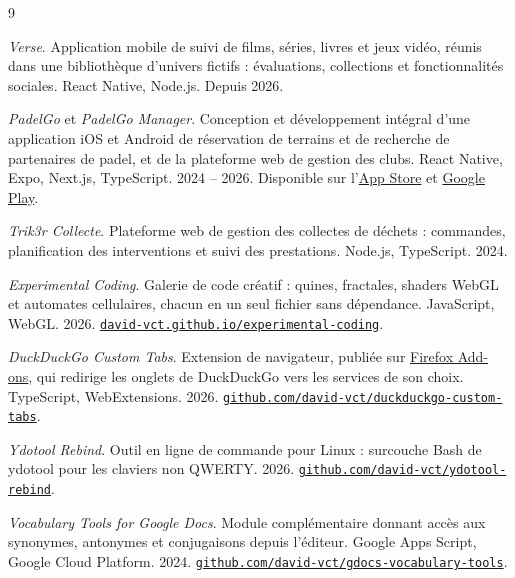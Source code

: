 \documentclass[10pt,a4paper]{article}
\begin{document}
\begin{small}
\begin{thebibliography}{9}
\setlength{\itemsep}{1pt}

\textit{Verse}. Application mobile de suivi de films, séries, livres et jeux
vidéo, réunis dans une bibliothèque d’univers fictifs : évaluations,
collections et fonctionnalités sociales. React Native, Node.js. Depuis 2026.

\textit{PadelGo} et \textit{PadelGo Manager}. Conception et développement
intégral d’une application iOS et Android de réservation de terrains et de
recherche de partenaires de padel, et de la plateforme web de gestion des clubs.
React Native, Expo, Next.js, TypeScript. 2024 -- 2026.
Disponible sur
l’\href{https://apps.apple.com/ma/app/padelgo/id6743053827?l=fr-FR}{App Store}
et \href{https://play.google.com/store/apps/details?id=com.rmarsile.padelgo}{Google Play}.

\textit{Trik3r Collecte}. Plateforme web de gestion des collectes de déchets :
commandes, planification des interventions et suivi des prestations.
Node.js, TypeScript. 2024.

\textit{Experimental Coding}. Galerie de code créatif : quines, fractales,
shaders WebGL et automates cellulaires, chacun en un seul fichier sans
dépendance. JavaScript, WebGL. 2026.
\href{https://david-vct.github.io/experimental-coding/}{\nolinkurl{david-vct.github.io/experimental-coding}}.

\textit{DuckDuckGo Custom Tabs}. Extension de navigateur, publiée sur
\href{https://addons.mozilla.org/en-US/firefox/addon/duckduckgo-custom-tabs/}{Firefox Add-ons},
qui redirige les onglets de DuckDuckGo vers les services de son choix.
TypeScript, WebExtensions. 2026.
\href{https://github.com/david-vct/duckduckgo-custom-tabs}{\nolinkurl{github.com/david-vct/duckduckgo-custom-tabs}}.

\textit{Ydotool Rebind}. Outil en ligne de commande pour Linux : surcouche Bash
de ydotool pour les claviers non QWERTY. 2026.
\href{https://github.com/david-vct/ydotool-rebind}{\nolinkurl{github.com/david-vct/ydotool-rebind}}.

\textit{Vocabulary Tools for Google Docs}. Module complémentaire donnant accès
aux synonymes, antonymes et conjugaisons depuis l’éditeur. Google Apps Script,
Google Cloud Platform. 2024.
\href{https://github.com/david-vct/gdocs-vocabulary-tools}{\nolinkurl{github.com/david-vct/gdocs-vocabulary-tools}}.

\end{thebibliography}
\end{small}
\end{document}
